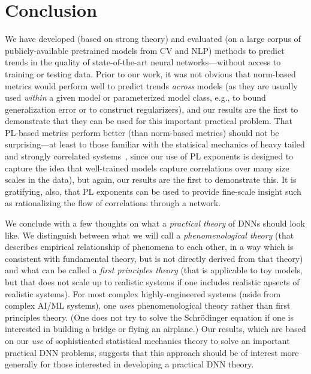 \section{Conclusion}
\label{sxn:conc}

We have developed (based on strong theory) and evaluated (on a large corpus of publicly-available pretrained models from CV and NLP) methods to predict trends in the quality of state-of-the-art neural networks---without access to training or testing data.
Prior to our work, it was not obvious that norm-based metrics would perform well to predict trends \emph{across} models (as they are usually used \emph{within} a given model or parameterized model class, e.g., to bound generalization error or to construct regularizers), and our results are the first to demonstrate that they can be used for this important practical problem.
That PL-based metrics perform better (than norm-based metrics) should not be surprising---at least to those familiar with the statisical mechanics of heavy tailed and strongly correlated systems~\cite{BouchaudPotters03, SornetteBook, BP11, bun2017}, since our use of PL exponents is designed to capture the idea that well-trained models capture correlations over many size scales in the data), but again,  our results are the first to demonstrate this.
It is gratifying, also, that PL exponents can be used to provide fine-scale insight such as rationalizing the flow of correlations through a network. 

We conclude with a few thoughts on what a \emph{practical theory} of DNNs should look like.
%
We distinguish between what we will call a
\emph{phenomenological theory}
(that describes empirical relationship of phenomena to each other, in a way which is consistent with fundamental theory, but is not directly derived from that theory)
and what can be called a 
\emph{first principles theory} 
(that is applicable to toy models, but that does not scale up to realistic systems if one includes realistic apsects of realistic systems).
%
For most complex highly-engineered systems (aside from complex AI/ML systems), one \emph{uses} phenomenological theory rather than first principles theory. 
(One does not try to solve the Schr\"odinger equation if one is interested in building a bridge or flying an airplane.)
%
Our results, which are based on our \emph{use} of sophisticated statistical mechanics theory to solve an important practical DNN problems, suggests that this approach should be of interest more generally for those interested in developing a practical DNN theory.



